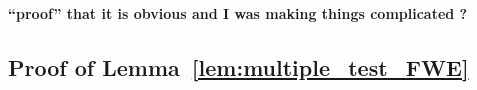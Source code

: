 \documentclass{article}
\theoremstyle{plain}
\theoremstyle{remark}
\newcommand{\1}{\mathbbm{1}}
\numberwithin{equation}{section}
\begin{document}


\paragraph{``proof'' that it is obvious  and I was making things complicated ?}

\subsection{Proof of Lemma~\ref{lem:multiple_test_FWE}}
\end{document}
